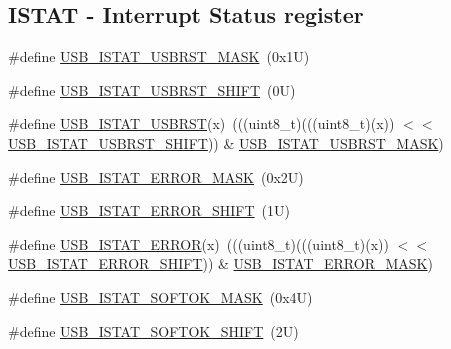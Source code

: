 \subsection*{I\+S\+T\+AT -\/ Interrupt Status register}
\begin{DoxyCompactItemize}
\item 
\#define \mbox{\hyperlink{group___u_s_b___register___masks_gaacafc35a1c208555b284f9f086708686}{U\+S\+B\+\_\+\+I\+S\+T\+A\+T\+\_\+\+U\+S\+B\+R\+S\+T\+\_\+\+M\+A\+SK}}~(0x1\+U)
\item 
\#define \mbox{\hyperlink{group___u_s_b___register___masks_gad463e743b6bdd9589a499bf654703da0}{U\+S\+B\+\_\+\+I\+S\+T\+A\+T\+\_\+\+U\+S\+B\+R\+S\+T\+\_\+\+S\+H\+I\+FT}}~(0\+U)
\item 
\#define \mbox{\hyperlink{group___u_s_b___register___masks_ga017e21472feb64dd84273dd693e72264}{U\+S\+B\+\_\+\+I\+S\+T\+A\+T\+\_\+\+U\+S\+B\+R\+ST}}(x)~(((uint8\+\_\+t)(((uint8\+\_\+t)(x)) $<$$<$ \mbox{\hyperlink{group___u_s_b___register___masks_gad463e743b6bdd9589a499bf654703da0}{U\+S\+B\+\_\+\+I\+S\+T\+A\+T\+\_\+\+U\+S\+B\+R\+S\+T\+\_\+\+S\+H\+I\+FT}})) \& \mbox{\hyperlink{group___u_s_b___register___masks_gaacafc35a1c208555b284f9f086708686}{U\+S\+B\+\_\+\+I\+S\+T\+A\+T\+\_\+\+U\+S\+B\+R\+S\+T\+\_\+\+M\+A\+SK}})
\item 
\#define \mbox{\hyperlink{group___u_s_b___register___masks_gaef490eac989ee78a88372bcbf3b029c6}{U\+S\+B\+\_\+\+I\+S\+T\+A\+T\+\_\+\+E\+R\+R\+O\+R\+\_\+\+M\+A\+SK}}~(0x2\+U)
\item 
\#define \mbox{\hyperlink{group___u_s_b___register___masks_gaa4afff6c8a78b6b44f3e314dd4746892}{U\+S\+B\+\_\+\+I\+S\+T\+A\+T\+\_\+\+E\+R\+R\+O\+R\+\_\+\+S\+H\+I\+FT}}~(1\+U)
\item 
\#define \mbox{\hyperlink{group___u_s_b___register___masks_ga0c8f9127484432972e279a49a97902b8}{U\+S\+B\+\_\+\+I\+S\+T\+A\+T\+\_\+\+E\+R\+R\+OR}}(x)~(((uint8\+\_\+t)(((uint8\+\_\+t)(x)) $<$$<$ \mbox{\hyperlink{group___u_s_b___register___masks_gaa4afff6c8a78b6b44f3e314dd4746892}{U\+S\+B\+\_\+\+I\+S\+T\+A\+T\+\_\+\+E\+R\+R\+O\+R\+\_\+\+S\+H\+I\+FT}})) \& \mbox{\hyperlink{group___u_s_b___register___masks_gaef490eac989ee78a88372bcbf3b029c6}{U\+S\+B\+\_\+\+I\+S\+T\+A\+T\+\_\+\+E\+R\+R\+O\+R\+\_\+\+M\+A\+SK}})
\item 
\#define \mbox{\hyperlink{group___u_s_b___register___masks_gab45774502290aab38038a19110e8558b}{U\+S\+B\+\_\+\+I\+S\+T\+A\+T\+\_\+\+S\+O\+F\+T\+O\+K\+\_\+\+M\+A\+SK}}~(0x4\+U)
\item 
\#define \mbox{\hyperlink{group___u_s_b___register___masks_gae58407103a8cebfc9c4a8e8c7f08fddb}{U\+S\+B\+\_\+\+I\+S\+T\+A\+T\+\_\+\+S\+O\+F\+T\+O\+K\+\_\+\+S\+H\+I\+FT}}~(2\+U)

\end{DoxyCompactItemize}

